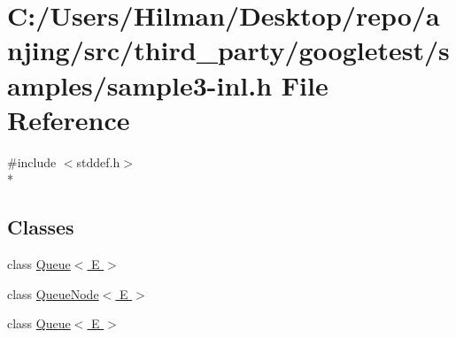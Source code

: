 \hypertarget{sample3-inl_8h}{}\section{C\+:/\+Users/\+Hilman/\+Desktop/repo/anjing/src/third\+\_\+party/googletest/samples/sample3-\/inl.h File Reference}
\label{sample3-inl_8h}
{\ttfamily \#include $<$stddef.\+h$>$}\\*
\subsection*{Classes}
\begin{DoxyCompactItemize}
\item 
class \hyperlink{class_queue}{Queue$<$ E $>$}
\item 
class \hyperlink{class_queue_node}{Queue\+Node$<$ E $>$}
\item 
class \hyperlink{class_queue}{Queue$<$ E $>$}
\end{DoxyCompactItemize}
